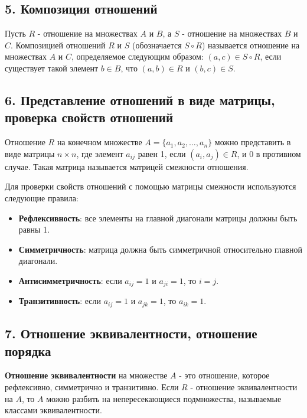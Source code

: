 \documentclass{article}
\begin{document}
\subsection*{5. Композиция отношений}

Пусть \( R \) - отношение на множествах \( A \) и \( B \), а \( S \) - отношение на множествах \( B \) и \( C \). Композицией отношений \( R \) и \( S \) (обозначается \( S \circ R \)) называется отношение на множествах \( A \) и \( C \), определяемое следующим образом: \( (a, c) \in S \circ R \), если существует такой элемент \( b \in B \), что \( (a, b) \in R \) и \( (b, c) \in S \).

\subsection*{6. Представление отношений в виде матрицы, проверка свойств отношений}

Отношение \( R \) на конечном множестве \( A = \{a_1, a_2, \ldots, a_n\} \) можно представить в виде матрицы \( n \times n \), где элемент \( a_{ij} \) равен 1, если \( (a_i, a_j) \in R \), и 0 в противном случае. Такая матрица называется матрицей смежности отношения.

Для проверки свойств отношений с помощью матрицы смежности используются следующие правила:
\begin{itemize}
    \item \textbf{Рефлексивность}: все элементы на главной диагонали матрицы должны быть равны 1.
    \item \textbf{Симметричность}: матрица должна быть симметричной относительно главной диагонали.
    \item \textbf{Антисимметричность}: если \( a_{ij} = 1 \) и \( a_{ji} = 1 \), то \( i = j \).
    \item \textbf{Транзитивность}: если \( a_{ij} = 1 \) и \( a_{jk} = 1 \), то \( a_{ik} = 1 \).
\end{itemize}


\subsection*{7. Отношение эквивалентности, отношение порядка}

\textbf{Отношение эквивалентности} на множестве \( A \) - это отношение, которое рефлексивно, симметрично и транзитивно. Если \( R \) - отношение эквивалентности на \( A \), то \( A \) можно разбить на непересекающиеся подмножества, называемые классами эквивалентности.
\end{document}
